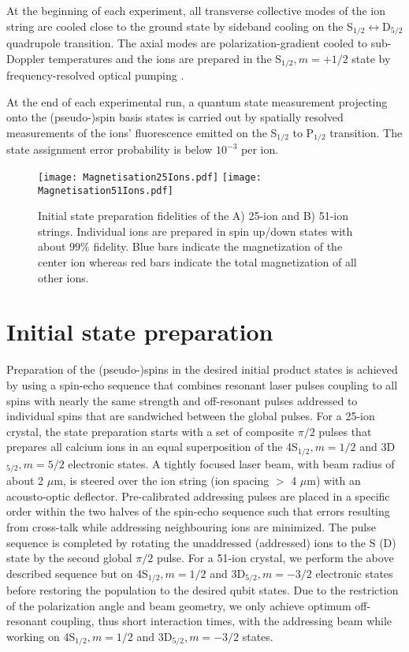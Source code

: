 \documentclass[aps,10pt,reprint,groupedaddress,superscriptaddress]{revtex4-2}
\begin{document}
At the beginning of each experiment, all transverse collective modes of the ion string are cooled close to the ground state by sideband cooling on the S${}_{1/2}\leftrightarrow \text{D}{}_{5/2}$ quadrupole transition. The axial modes are polarization-gradient cooled to sub-Doppler temperatures and the ions are prepared in the S$_{1/2},m=+1/2$ state by frequency-resolved optical pumping \cite{Joshi_2020}.

At the end of each experimental run, a quantum state measurement projecting onto the (pseudo-)spin basis states is carried out by spatially resolved measurements of the ions' fluorescence emitted on the S$_{1/2}$ to P$_{1/2}$ transition. The state assignment error probability is below $10^{-3}$ per ion.

\begin{figure*}
\centering
\texttt{[image: Magnetisation25Ions.pdf]}
\texttt{[image: Magnetisation51Ions.pdf]}
\caption{Initial state preparation fidelities of the A) 25-ion and B) 51-ion strings. Individual ions are prepared in spin up/down states with about $99\%$ fidelity. Blue bars indicate the magnetization of the center ion whereas red bars indicate the total magnetization of all other ions.} \label{fig:InitialStatePrep}
\end{figure*}


\section{Initial state preparation}
Preparation of the (pseudo-)spins in the desired initial product states is achieved by using a spin-echo sequence that combines resonant laser pulses coupling to all spins with nearly the same strength and off-resonant pulses addressed to individual spins that are sandwiched between the global pulses. For a 25-ion crystal, the state preparation starts with a set of composite $\pi/2$ pulses that prepares all calcium ions in an equal superposition of the 4S$_{1/2},m=1/2$ and 3D$_{5/2},m=5/2$ electronic states. A tightly focused laser beam, with beam radius of about 2 $\mu$m, is steered over the ion string (ion spacing $>$ 4 $\mu$m) with an acousto-optic deflector. Pre-calibrated addressing pulses are placed in a specific order within the two halves of the spin-echo sequence such that errors resulting from cross-talk while addressing neighbouring ions are minimized. The pulse sequence is completed by rotating the unaddressed (addressed) ions to the S (D) state by the second global $\pi/2$ pulse. For a 51-ion crystal, we perform the above described sequence but on 4S$_{1/2},m=1/2$ and 3D$_{5/2},m=-3/2$ electronic states before restoring the population to the desired qubit states. Due to the restriction of the polarization angle and beam geometry, we only achieve optimum off-resonant coupling, thus short interaction times, with the addressing beam while working on 4S$_{1/2},m=1/2$ and 3D$_{5/2},m=-3/2$ states. 
\end{document}

